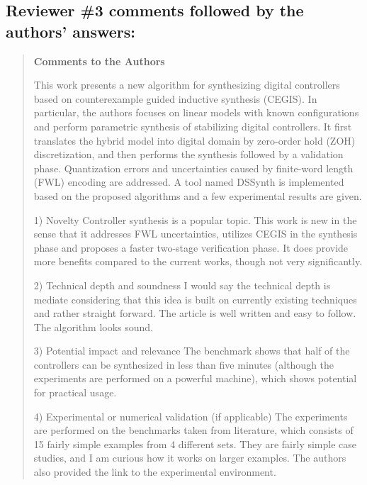 \documentclass[11pt]{article}
\begin{document}


\newpage

\subsection*{Reviewer \#3 comments followed by the authors' answers:}
\begin{quote}

{\bf Comments to the Authors}

This work presents a new algorithm for synthesizing digital controllers based on counterexample guided inductive synthesis (CEGIS). In particular, the authors focuses on linear models with known configurations and perform parametric synthesis of stabilizing digital controllers. It first translates the hybrid model into digital domain by zero-order hold (ZOH) discretization, and then performs the synthesis followed by a validation phase. Quantization errors and uncertainties caused by finite-word length (FWL) encoding are addressed. A tool named DSSynth is implemented based on the proposed algorithms and a few experimental results are given.

1) Novelty
Controller synthesis is a popular topic. This work is new in the sense that it addresses FWL uncertainties, utilizes CEGIS in the synthesis phase and proposes a faster two-stage verification phase. It does provide more benefits compared to the current works, though not very significantly.

2) Technical depth and soundness 
I would say the technical depth is mediate considering that this idea is built on currently existing techniques and rather straight forward. The article is well written and easy to follow. The algorithm looks sound. 

3) Potential impact and relevance
The benchmark shows that half of the controllers can be synthesized in less than five minutes (although the experiments are performed on a powerful machine), which shows potential for practical usage.

4) Experimental or numerical validation (if applicable) 
The experiments are performed on the benchmarks taken from literature, which consists of 15 fairly simple examples from 4 different sets. They are fairly simple case studies, and I am curious how it works on larger examples. The authors also provided the link to the experimental environment.


\end{quote}
\end{document}
